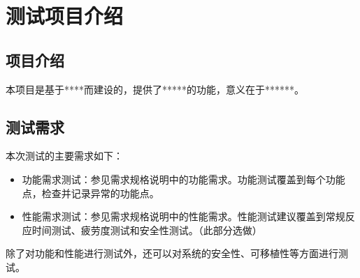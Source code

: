 \chapter{测试项目介绍}

\section{项目介绍}
本项目是基于****而建设的，提供了*****的功能，意义在于******。

\section{测试需求}
本次测试的主要需求如下：
\begin{itemize}
    \item 功能需求测试：参见需求规格说明中的功能需求。功能测试覆盖到每个功能点，检查并记录异常的功能点。
    \item 性能需求测试：参见需求规格说明中的性能需求。性能测试建议覆盖到常规反应时间测试、疲劳度测试和安全性测试。（此部分选做）
\end{itemize}

除了对功能和性能进行测试外，还可以对系统的安全性、可移植性等方面进行测试。
